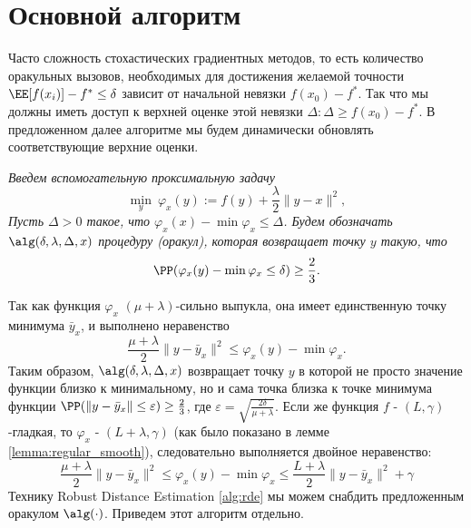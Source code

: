 \section{Основной алгоритм}\label{sec:conseq_approx}
Часто сложность стохастических градиентных методов, то есть количество оракульных вызовов, необходимых для достижения желаемой точности $\EE [f(x_i)]-f^*\leq \delta$ зависит от начальной невязки $f(x_0)-f^*$. Так что мы должны иметь доступ к верхней оценке этой невязки $\Delta : \Delta\geq f(x_0)-f^*$. В предложенном далее алгоритме мы будем динамически обновлять соответствующие верхние оценки.

\begin{assumption}\label{ass:alg_min_orc}{\em
Введем вспомогательную проксимальную задачу
$$\min_y~ \varphi_x(y):=f(y)+\frac{\lambda}{2}\|y- x\|^2,$$
Пусть $\Delta>0$ такое, что $\varphi_x(x)-\min \varphi_x\leq \Delta$.
Будем обозначать $\alg(\delta,\lambda,\Delta, x)$ процедуру (оракул), которая возвращает точку $y$ такую, что
$$\PP(\varphi_x(y)-\min \varphi_x\leq \delta)\geq\frac{2}{3}.$$}
\end{assumption}

Так как функция $\varphi_x$ $(\mu+\lambda)$-сильно выпукла, она имеет единственную точку минимума $\bar y_x$, и выполнено неравенство
$$\frac{\mu+\lambda}{2}\|y-\bar y_x\|^2 \leq\varphi_x(y)-\min\varphi_x.$$
Таким образом, $\alg(\delta,\lambda,\Delta, x)$ возвращает точку $y$ в которой не просто значение функции близко к минимальному, но и сама точка близка к точке минимума функции $\PP(\|y-\bar y_x\|\leq\varepsilon)\geq \frac{2}{3}$, где $\varepsilon=\sqrt{\frac{2\delta}{\mu+\lambda}}$. Если же функция $f$ - $(L, \gamma)$-гладкая, то $\varphi_x$ - $(L + \lambda, \gamma)$ (как было показано в лемме \ref{lemma:regular_smooth}), следовательно выполняется двойное неравенство:
\begin{equation*}
    \frac{\mu+\lambda}{2}\|y-\bar y_x\|^2 \leq\varphi_x(y)-\min\varphi_x \leq \frac{L+\lambda}{2}\|y-\bar y_x\|^2 + \gamma
\end{equation*}
Технику Robust Distance Estimation \eqref{alg:rde} мы можем снабдить предложенным оракулом $\alg(\cdot)$. Приведем этот алгоритм отдельно.

